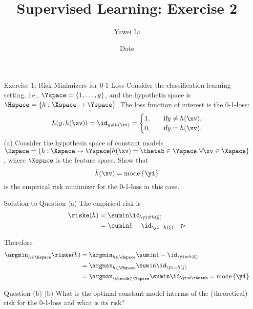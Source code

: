 \documentclass[aspectratio=169]{beamer}
\title[]{\textbf{Supervised Learning: Exercise 2}}
\author{Yawei Li}
\institute[LMU]
{
\\
  \texttt{yawei.li@stat.uni-muenchen.de}
}
\date{Date}
\begin{document}
\begin{frame}
\titlepage

\end{frame}


\begin{frame}{Exercise 1: Risk Minimizers for 0-1-Loss}
	Consider the classification learning setting, i.e., $\Yspace = \{1, \ldots, g\}$, and the hypothetis space is $\Hspace = \{h: \Xspace \rightarrow \Yspace \}$. The loss function of interest is the 0-1-loss:
	$$L(y, h(\xv)) = \id_{y \neq h(\xv)} = \begin{cases}
		1, \quad &\text{if} y \neq h(\xv), \\
		0, \quad &\text{if} y = h(\xv).
	\end{cases}
	$$
	(a) Consider the hypothesis space of constant models $\Hspace = \{h: \Xspace \rightarrow \Yspace | h(\xv) = \thetab \in \Yspace \ \forall \xv \in \Xspace \}$, where $\Xspace$ is the feature space. Show that 
	$$
		\hat{h}(\xv) = \mathrm{mode} \left\{\yi \right\}
	$$
	is the empirical risk minimizer for the 0-1-loss in this case.
\end{frame}

\begin{frame}{Solution to Question (a)}
\small
The empirical risk is
	\begin{align*}
		\riske(h) &= \sumin \id_{\yi \neq h(\xi)} \\
		&=\sumin 1 - \id_{\yi = h(\xi)} \quad \rhd \\
	\end{align*}

Therefore
\begin{align*}
	\argmin_{h \in \Hspace} \riske(h) 
	&= \argmin_{h \in \Hspace} \sumin 1 - \id_{\yi = h(\xi)} \\ 
	&= \argmax_{h \in \Hspace} \sumin \id_{\yi = h(\xi)} \\
	&= \argmax_{\thetab \in \Yspace} \sumin \id_{\yi = \thetab} =\mathrm{mode} \left\{ \yi \right\}
\end{align*}
	
\end{frame}

\begin{frame}{Question (b)}
	(b) What is the optimal constant model interms of the (theoretical) risk for the 0-1-loss and what is its risk?
\end{frame}
\end{document}
